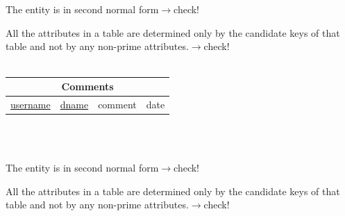 \documentclass[12pt]{article}
\begin{document}
~\\~\\
\par The entity is in second normal form\hfill $\rightarrow$check!
\par All the attributes in a table are determined only by the candidate keys of that table and not by any non-prime attributes.\hfill $\rightarrow$check!\\
~\\
\begin{tabularx}{\textwidth}{|X|X|X|X|}
\hline
\multicolumn{4}{|c|}{\cellcolor{green!25}Comments}\\\hline
\cellcolor{green!25}\underline{username} & \cellcolor{green!25}\underline{dname} & \cellcolor{green!25}comment & \cellcolor{green!25}date\\\hline
\end{tabularx}
~\\~\\
\par The entity is in second normal form\hfill $\rightarrow$check!
\par All the attributes in a table are determined only by the candidate keys of that table and not by any non-prime attributes.\hfill $\rightarrow$check!
\end{document}
